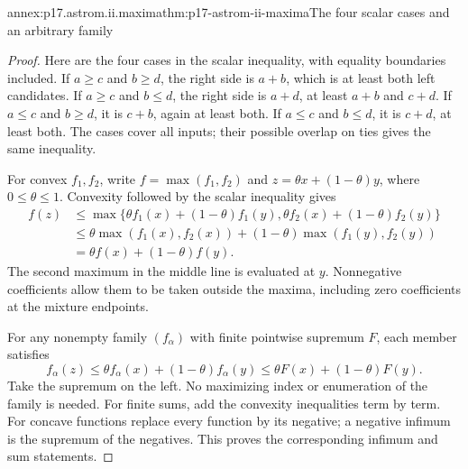 \begin{annexitem}{annex:p17.astrom.ii.maxima}{thm:p17-astrom-ii-maxima}{The four scalar cases and an arbitrary family}
\begin{proof}
Here are the four cases in the scalar inequality,
with equality boundaries included.
If \(a\geq c\) and \(b\geq d\), the right side is
\(a+b\), which is at least both left candidates.
If \(a\geq c\) and \(b\leq d\), the right side is
\(a+d\), at least \(a+b\) and \(c+d\).
If \(a\leq c\) and \(b\geq d\), it is \(c+b\),
again at least both. If \(a\leq c\) and \(b\leq d\),
it is \(c+d\), at least both.
The cases cover all inputs; their possible overlap
on ties gives the same inequality.

For convex \(f_1,f_2\), write
\(f=\max(f_1,f_2)\) and \(z=\theta x+(1-\theta)y\),
where \(0\leq\theta\leq1\).
Convexity followed by the scalar inequality gives
\[
 \begin{split}
 f(z)&\leq
 \max\{\theta f_1(x)+(1-\theta)f_1(y),
                \theta f_2(x)+(1-\theta)f_2(y)\}\\
 &\leq\theta\max(f_1(x),f_2(x))
             +(1-\theta)\max(f_1(y),f_2(y))\\
 &=\theta f(x)+(1-\theta)f(y).
 \end{split}
\]
The second maximum in the middle line is evaluated
at \(y\). Nonnegative coefficients allow them to
be taken outside the maxima, including zero
coefficients at the mixture endpoints.

For any nonempty family \((f_\alpha)\) with finite
pointwise supremum \(F\), each member satisfies
\[
 f_\alpha(z)\leq
       \theta f_\alpha(x)+(1-\theta)f_\alpha(y)
                \leq\theta F(x)+(1-\theta)F(y).
\]
Take the supremum on the left.
No maximizing index or enumeration of the family
is needed. For finite sums, add the convexity
inequalities term by term.
For concave functions replace every function
by its negative; a negative infimum is the
supremum of the negatives. This proves the
corresponding infimum and sum statements.
\end{proof}
\end{annexitem}

